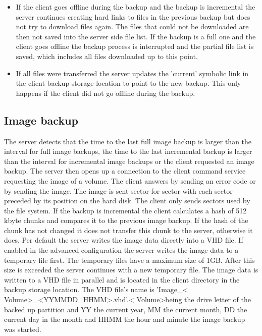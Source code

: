 \documentclass[a4paper,10pt]{article}
\begin{document}
\begin{itemize}
\item If the client goes offline during the backup and the backup is incremental the server continues creating hard links to files in the previous backup but does not try to download files again. The files that could not be downloaded are then not saved into the server side file list. If the backup is a full one and the client goes offline the backup process is interrupted and the partial file list is saved, which includes all files downloaded up to this point.
\item If all files were transferred the server updates the 'current' symbolic link in the client backup storage location to point to the new backup. This only happens if the client did not go offline during the backup.
\end{itemize}

\subsection{Image backup}

The server detects that the time to the last full image backup is larger than
the interval for full image backups, the time to the last incremental backup is
larger than the interval for incremental image backups or the client requested
an image backup. The server then opens up a connection to the client command
service requesting the image of a volume. The client answers by sending an error
code or by sending the image. The image is sent sector for sector with each
sector preceded by its position on the hard disk. The client only sends sectors
used by the file system. If the backup is incremental the client calculates a
hash of 512 kbyte chunks and compares it to the previous image backup. If the
hash of the chunk has not changed it does not transfer this chunk to the server,
otherwise it does. Per default the server writes the image data directly into
a VHD file. If enabled in the advanced configuration the server writes the image
data to a temporary file first. 
The temporary files have a maximum size of 1GB. After this size is exceeded the
server continues with a new temporary file. The image data is written to a VHD
file in parallel and is located in the client directory in
the backup storage location. The VHD file's name is 'Image\_\textless
Volume\textgreater\_\textless YYMMDD\_HHMM\textgreater.vhd'.\textless
Volume\textgreater  being the drive letter of the backed up partition and YY the
current year, MM the current month, DD the current day in the month and HHMM the
hour and minute the image backup was started.
\end{document}
